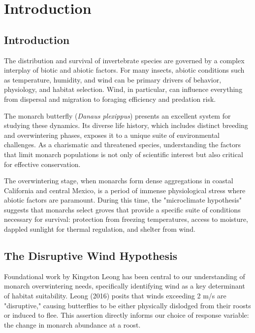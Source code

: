 \chapter{Introduction}
\label{ch:introduction}

\section{Introduction}

The distribution and survival of invertebrate species are governed by a complex interplay of biotic and abiotic factors. For many insects, abiotic conditions such as temperature, humidity, and wind can be primary drivers of behavior, physiology, and habitat selection. Wind, in particular, can influence everything from dispersal and migration to foraging efficiency and predation risk.

The monarch butterfly (\textit{Danaus plexippus}) presents an excellent system for studying these dynamics. Its diverse life history, which includes distinct breeding and overwintering phases, exposes it to a unique suite of environmental challenges. As a charismatic and threatened species, understanding the factors that limit monarch populations is not only of scientific interest but also critical for effective conservation.

The overwintering stage, when monarchs form dense aggregations in coastal California and central Mexico, is a period of immense physiological stress where abiotic factors are paramount. During this time, the "microclimate hypothesis" suggests that monarchs select groves that provide a specific suite of conditions necessary for survival: protection from freezing temperatures, access to moisture, dappled sunlight for thermal regulation, and shelter from wind.

\section{The Disruptive Wind Hypothesis}

Foundational work by Kingston Leong has been central to our understanding of monarch overwintering needs, specifically identifying wind as a key determinant of habitat suitability. Leong (2016) posits that winds exceeding 2 m/s are "disruptive," causing butterflies to be either physically dislodged from their roosts or induced to flee. This assertion directly informs our choice of response variable: the change in monarch abundance at a roost.


